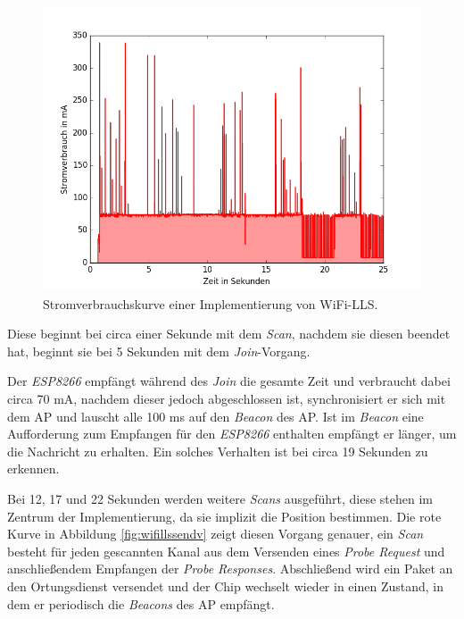 \begin{figure}[h!]
  \centering
	\includegraphics[width=\textwidth]{plots/wifills.png}
  \caption{Stromverbrauchskurve einer Implementierung von WiFi-LLS.}
  \label{fig:wifills}
\end{figure}

Diese beginnt bei circa einer Sekunde mit dem \emph{Scan}, nachdem sie diesen beendet hat, beginnt sie bei 5 Sekunden mit dem \emph{Join}-Vorgang.

Der \emph{ESP8266} empfängt während des \emph{Join} die gesamte Zeit und verbraucht dabei circa 70 mA, nachdem dieser jedoch abgeschlossen ist, synchronisiert er sich mit dem AP und lauscht alle 100 ms auf den \emph{Beacon} des AP.
Ist im \emph{Beacon} eine Aufforderung zum Empfangen für den \emph{ESP8266} enthalten empfängt er länger, um die Nachricht zu erhalten.
Ein solches Verhalten ist bei circa 19 Sekunden zu erkennen.

Bei 12, 17 und 22 Sekunden werden weitere \emph{Scans} ausgeführt, diese stehen im Zentrum der Implementierung, da sie implizit die Position bestimmen.
Die rote Kurve in Abbildung \ref{fig:wifillssendv} zeigt diesen Vorgang genauer, ein \emph{Scan} besteht für jeden gescannten Kanal aus dem Versenden eines \emph{Probe Request} und anschließendem Empfangen der \emph{Probe Responses}. 
Abschließend wird ein Paket an den Ortungsdienst versendet und der Chip wechselt wieder in einen Zustand, in dem er periodisch die \emph{Beacons} des AP empfängt.

